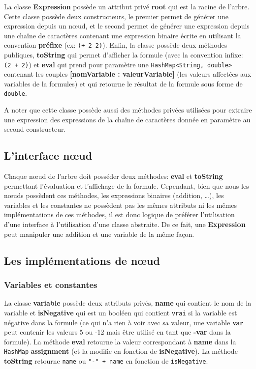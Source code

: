 \documentclass[a4paper]{article}
\begin{document}
  La classe \textbf{Expression} possède un attribut privé \textbf{root} qui est
  la racine de l'arbre. Cette classe possède deux constructeurs, le premier
  permet de générer une expression depuis un nœud, et le second permet de
  générer une expression depuis une chaîne de caractères contenant une
  expression binaire écrite en utilisant la convention \textbf{préfixe} (ex:
  \texttt{(+ 2 2)}). Enfin, la classe possède deux méthodes publiques,
  \textbf{toString} qui permet d'afficher la formule (avec la convention
  infixe: \texttt{(2 + 2)}) et \textbf{eval} qui prend pour paramètre une
  \texttt{HashMap<String, double>} contenant les couples \textbf{[nomVariable :
  valeurVariable]} (les valeurs affectées aux variables de la formules) et qui
  retourne le résultat de la formule sous forme de \texttt{double}.

  A noter que cette classe possède aussi des méthodes privées utilisées pour
  extraire une expression des expressions de la chaîne de caractères donnée en
  paramètre au second constructeur.

  \subsection{L'interface nœud}%
  \label{sub:L'interface noeud}

  Chaque nœud de l'arbre doit posséder deux méthodes: \textbf{eval} et
  \textbf{toString} permettant l'évaluation et l'affichage de la formule.
  Cependant, bien que nous les nœuds possèdent ces méthodes, les expressions
  binaires (addition, \dots), les variables et les constantes ne possèdent pas
  les mêmes attributs ni les mêmes implémentations de ces méthodes, il est donc
  logique de préférer l'utilisation d'une interface à l'utilisation d'une classe
  abstraite. De ce fait, une \textbf{Expression} peut manipuler une addition et
  une variable de la même façon.

  \subsection{Les implémentations de nœud}%
  \label{sub:Les implémentations de noeud}

  \subsubsection{Variables et constantes}%
  \label{ssub:Variables et constantes}

  La classe \textbf{variable}  possède deux attributs privés, \textbf{name} qui
  contient le nom de la variable et \textbf{isNegative} qui est un booléen qui
  contient \texttt{vrai} si la variable est négative dans la formule (ce qui
  n'a rien à voir avec sa valeur, une variable \textbf{var} peut contenir les
  valeurs 5 ou -12 mais être utilisé en tant que \textbf{-var} dans la
  formule). La méthode \textbf{eval} retourne la valeur correspondant à
  \textbf{name} dans la \texttt{HashMap} \textbf{assignment} (et la modifie en
  fonction de \textbf{isNegative}). La méthode \textbf{toString} retourne
  \texttt{name} ou \texttt{"-" + name} en fonction de \texttt{isNegative}.
\end{document}
